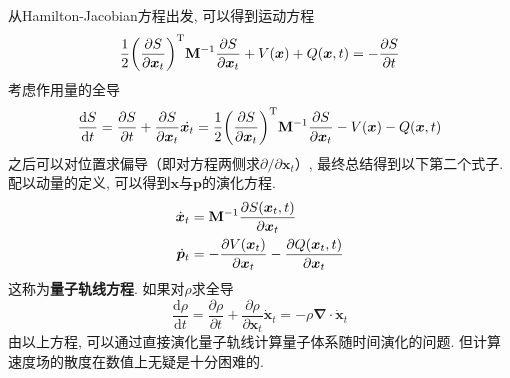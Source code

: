         从Hamilton-Jacobian方程出发, 可以得到运动方程
        \begin{equation}
            \frac 12 \bigg(\frac {\partial S}{\partial \bm{x}_t}\bigg)^{\mathrm{T}} \mathbf{M}^{-1} \frac {\partial S}{\partial \bm{x}_t} + V(\bm{x}) + Q(\bm{x}, t) = -\frac {\partial S}{\partial t}
        \end{equation}
        考虑作用量的全导
        \begin{equation}
            \frac {\mathrm{d}S}{\mathrm{d}t} = \frac {\partial S}{\partial t} + \frac {\partial S}{\partial \bm{x}_t} \dot{\bm{x}_t} = \frac 12 \bigg(\frac {\partial S}{\partial \bm{x}_t}\bigg)^{\mathrm{T}} \mathbf{M}^{-1} \frac {\partial S}{\partial \bm{x}_t} - V(\bm{x}) - Q(\bm{x}, t)
        \end{equation}
        之后可以对位置求偏导（即对方程两侧求${\partial} / {\partial \bm{x}_t}$）, 最终总结得到以下第二个式子. 配以动量的定义, 可以得到$\bm{x}$与$\bm{p}$的演化方程. 
        \begin{equation}\begin{aligned}
            \dot{\bm{x}}_t &= \mathbf{M}^{-1} \frac {\partial S(\bm{x}_t,t)}{\partial \bm{x}_t} \\
            \dot{\bm{p}}_t &= -\frac {\partial V(\bm{x}_t)}{\partial \bm{x}_t} - \frac {\partial Q(\bm{x}_t, t)}{\partial \bm{x}_t}
        \end{aligned}\end{equation}
        这称为\textbf{量子轨线方程}. 如果对$\rho$求全导
        \begin{equation}
            \frac {\mathrm{d}\rho}{\mathrm{d}t} = \frac {\partial \rho}{\partial t} + \frac {\partial \rho}{\partial \bm{x}_t} \dot{\bm{x}}_t = -\rho \bm{\nabla} \cdot \dot{\bm{x}}_t
        \end{equation}
        由以上方程, 可以通过直接演化量子轨线计算量子体系随时间演化的问题. 但计算速度场的散度在数值上无疑是十分困难的. 

        
        